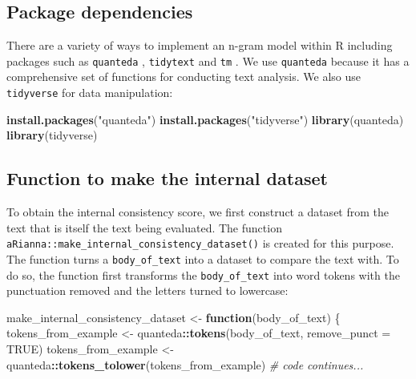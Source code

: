 \documentclass[11pt,]{article}
\newenvironment{Shaded}{\begin{snugshade}}{\end{snugshade}}
\newcommand{\CommentTok}[1]{\textcolor[rgb]{0.56,0.35,0.01}{\textit{#1}}}
\newcommand{\ControlFlowTok}[1]{\textcolor[rgb]{0.13,0.29,0.53}{\textbf{#1}}}
\newcommand{\DataTypeTok}[1]{\textcolor[rgb]{0.13,0.29,0.53}{#1}}
\newcommand{\KeywordTok}[1]{\textcolor[rgb]{0.13,0.29,0.53}{\textbf{#1}}}
\newcommand{\NormalTok}[1]{#1}
\newcommand{\OperatorTok}[1]{\textcolor[rgb]{0.81,0.36,0.00}{\textbf{#1}}}
\newcommand{\OtherTok}[1]{\textcolor[rgb]{0.56,0.35,0.01}{#1}}
\newcommand{\StringTok}[1]{\textcolor[rgb]{0.31,0.60,0.02}{#1}}
\begin{document}
\hypertarget{package-dependencies}{%
\subsection{Package dependencies}\label{package-dependencies}}

There are a variety of ways to implement an n-gram model within R \citep{citeR} including packages such as \texttt{quanteda} \citep{citequanteda}, \texttt{tidytext} \citep{citetidytext} and \texttt{tm} \citep{citetm}. We use \texttt{quanteda} because it has a comprehensive set of functions for conducting text analysis. We also use \texttt{tidyverse} \citep{citetidyverse} for data manipulation:

\begin{Shaded}
\begin{Highlighting}[]
\KeywordTok{install.packages}\NormalTok{(}\StringTok{"quanteda"}\NormalTok{)}
\KeywordTok{install.packages}\NormalTok{(}\StringTok{"tidyverse"}\NormalTok{)}
\KeywordTok{library}\NormalTok{(quanteda)}
\KeywordTok{library}\NormalTok{(tidyverse)}
\end{Highlighting}
\end{Shaded}

\hypertarget{function-to-make-the-internal-dataset}{%
\subsection{Function to make the internal dataset}\label{function-to-make-the-internal-dataset}}

To obtain the internal consistency score, we first construct a dataset from the text that is itself the text being evaluated. The function \texttt{aRianna::make\_internal\_consistency\_dataset()} is created for this purpose. The function turns a \texttt{body\_of\_text} into a dataset to compare the text with. To do so, the function first transforms the \texttt{body\_of\_text} into word tokens with the punctuation removed and the letters turned to lowercase:

\begin{Shaded}
\begin{Highlighting}[]
\NormalTok{make_internal_consistency_dataset <-}\StringTok{ }
\StringTok{  }\ControlFlowTok{function}\NormalTok{(body_of_text) \{}
\NormalTok{  tokens_from_example <-}\StringTok{ }
\StringTok{    }\NormalTok{quanteda}\OperatorTok{::}\KeywordTok{tokens}\NormalTok{(body_of_text, }\DataTypeTok{remove_punct =} \OtherTok{TRUE}\NormalTok{)}
\NormalTok{  tokens_from_example <-}\StringTok{ }
\StringTok{    }\NormalTok{quanteda}\OperatorTok{::}\KeywordTok{tokens_tolower}\NormalTok{(tokens_from_example)}
  \CommentTok{# code continues...}
\end{Highlighting}
\end{Shaded}
\end{document}
